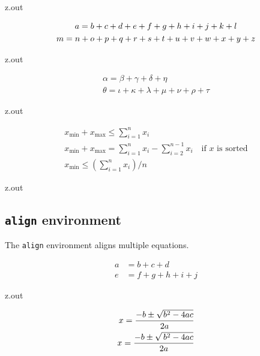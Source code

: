 \MyIO


\begin{VerbatimOut}{z.out}

\begin{gather}
  a = b + c + d + e + f + g + h + i + j + k + l\notag\\
  m = n + o + p + q + r + s + t + u + v + w + x + y + z
\end{gather}
\end{VerbatimOut}

\MyIO


\begin{VerbatimOut}{z.out}

\begin{gather*}
  \alpha = \beta + \gamma + \delta + \eta\\
  \theta = \iota + \kappa + \lambda + \mu + \nu + \rho + \tau
\end{gather*}
\end{VerbatimOut}

\MyIO


\begin{VerbatimOut}{z.out}

\begin{gather}
  x_\text{min} + x_\text{max} \le \sum_{i=1}^n x_i\\
  x_\text{min} + x_\text{max}
    = \sum_{i=1}^n x_i - \sum_{i=2}^{n-1} x_i\quad\text{if $x$ is sorted}\\
  x_\text{min} \le \left(\sum_{i=1}^n x_i\right) / n
\end{gather}
\end{VerbatimOut}

\MyIOT


\begin{VerbatimOut}{z.out}

\subsection{\texttt{align} environment}

The \verb+align+ environment aligns multiple equations.

\begin{align}
  a &= b + c + d\\
  e &= f + g + h + i + j
\end{align}
\end{VerbatimOut}

\MyIO


\begin{VerbatimOut}{z.out}

\begin{align}
  x = \frac{-b \pm \sqrt{b^2-4ac}}{2a}\notag\\
  x = \frac{-b \pm \sqrt{\,b^2-4ac}}{2a}
\end{align}
\end{VerbatimOut}
\index{\verb+\begin{gather}+}
\index{\verb+\,+}


